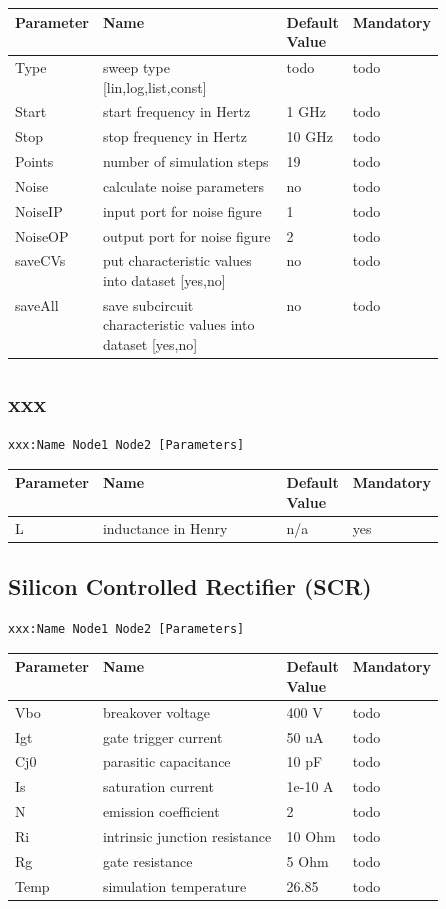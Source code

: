 \begin{tabular}{|l|p{0.5\linewidth}|l|l|}
\hline
Parameter & Name & Default Value & Mandatory \\
\hline
Type & sweep type [lin,log,list,const] & todo & todo \\
Start & start frequency in Hertz & 1 GHz & todo \\
Stop & stop frequency in Hertz & 10 GHz & todo \\
Points & number of simulation steps & 19 & todo \\
Noise & calculate noise parameters & no & todo \\
NoiseIP & input port for noise figure & 1 & todo \\
NoiseOP & output port for noise figure & 2 & todo \\
saveCVs & put characteristic values into dataset [yes,no] & no & todo \\
saveAll & save subcircuit characteristic values into dataset [yes,no] & no & todo \\
\hline
\end{tabular}

\subsection{xxx}

\begin{verbatim}
xxx:Name Node1 Node2 [Parameters]
\end{verbatim}


\begin{tabular}{|l|p{0.5\linewidth}|l|l|}
\hline
Parameter & Name & Default Value & Mandatory \\
\hline
L & inductance in Henry & n/a & yes \\
\hline
\end{tabular}




\subsection{Silicon Controlled Rectifier (SCR)}

\begin{verbatim}
xxx:Name Node1 Node2 [Parameters]
\end{verbatim}


\begin{tabular}{|l|p{0.5\linewidth}|l|l|}
\hline
Parameter & Name & Default Value & Mandatory \\
\hline
Vbo & breakover voltage & 400 V & todo \\
Igt & gate trigger current & 50 uA & todo \\
Cj0 & parasitic capacitance & 10 pF & todo \\
Is & saturation current & 1e-10 A & todo \\
N & emission coefficient & 2 & todo \\
Ri & intrinsic junction resistance & 10 Ohm & todo \\
Rg & gate resistance & 5 Ohm & todo \\
Temp & simulation temperature & 26.85 & todo \\
\hline
\end{tabular}


